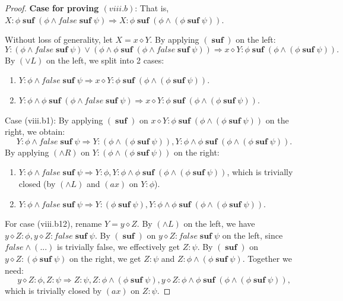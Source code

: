 \documentclass[manuscript,screen]{acmart}
\newcommand{\false}[0]{\mathit{false}}
\newcommand{\cat}[0]{\diamond}
\DeclareMathOperator{\osuf}{\mathbf{suf}}
\begin{document}
\begin{proof}
\textbf{Case for proving $(viii.b)$}:
That is, $X : \phi\osuf(\phi\wedge \false\osuf\psi)\Rightarrow X : \phi\osuf(\phi\wedge(\phi\osuf\psi))$.

Without loss of generality, let $X = x\cat Y$. By applying $(\osuf)$ on the left:
$$
Y : (\phi\wedge \false\osuf\psi)\vee (\phi\wedge \phi\osuf(\phi\wedge \false\osuf\psi))\Rightarrow x\cat Y : \phi\osuf(\phi\wedge(\phi\osuf\psi)). 
$$
By $(\vee L)$ on the left, we split into 2 cases:

\begin{enumerate}
    \item[(viii.b1)] $Y : \phi\wedge \false\osuf\psi\Rightarrow x\cat Y : \phi\osuf(\phi\wedge(\phi\osuf\psi))$.
    \item[(viii.b2)] $Y : \phi\wedge \phi\osuf(\phi\wedge \false\osuf\psi)\Rightarrow x\cat Y : \phi\osuf(\phi\wedge(\phi\osuf\psi))$.
\end{enumerate}

Case (viii.b1): By applying $(\osuf)$ on $x\cat Y : \phi\osuf(\phi\wedge(\phi\osuf\psi))$ on the right, we obtain:
$$
Y : \phi\wedge \false\osuf\psi\Rightarrow Y : (\phi\wedge(\phi\osuf\psi)), Y : \phi\wedge \phi\osuf(\phi\wedge(\phi\osuf\psi)). 
$$
By applying $(\wedge R)$ on $Y : (\phi\wedge(\phi\osuf\psi))$ on the right:
\begin{enumerate}
    \item[(viii.b11)] $Y : \phi\wedge \false\osuf\psi\Rightarrow Y : \phi, Y : \phi\wedge \phi\osuf(\phi\wedge(\phi\osuf\psi))$, which is trivially closed (by $(\wedge L)$ and $(\textit{ax})$ on $Y:\phi$).
    \item[(viii.b12)] $Y : \phi\wedge \false\osuf\psi\Rightarrow Y : (\phi\osuf\psi), Y : \phi\wedge \phi\osuf(\phi\wedge(\phi\osuf\psi))$. 
\end{enumerate}
For case (viii.b12), rename $Y = y\cat Z$. By $(\wedge L)$ on the left, we have $y\cat Z : \phi, y\cat Z : \false\osuf\psi$. By $(\osuf)$ on $y\cat Z : \false\osuf\psi$ on the left, since $\false\wedge(...)$ is trivially false, we effectively get $Z : \psi$. By $(\osuf)$ on $y\cat Z : (\phi\osuf\psi)$ on the right, we get $Z : \psi$ and $Z : \phi\wedge(\phi\osuf\psi)$. Together we need:
$$
y\cat Z : \phi, Z : \psi\Rightarrow Z : \psi, Z : \phi\wedge(\phi\osuf\psi), y\cat Z : \phi\wedge \phi\osuf(\phi\wedge(\phi\osuf\psi)), 
$$
which is trivially closed by $(\textit{ax})$ on $Z : \psi$.


\end{proof}
\end{document}
